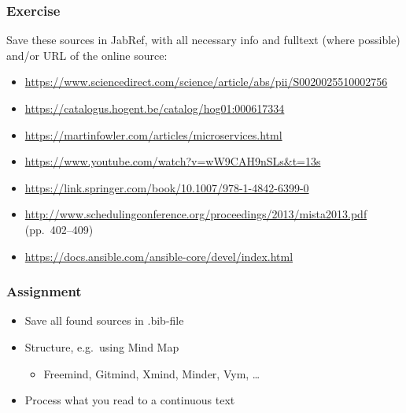\documentclass[aspectratio=169]{beamer}
\begin{document}
\begin{frame}[plain]
  \frametitle{Exercise}

  Save these sources in JabRef, with all necessary info and fulltext (where possible) and/or URL of the online source:

  \bigskip

  \begin{itemize}
    \item \url{https://www.sciencedirect.com/science/article/abs/pii/S0020025510002756}
    \item \url{https://catalogus.hogent.be/catalog/hog01:000617334}
    \item \url{https://martinfowler.com/articles/microservices.html}
    \item \url{https://www.youtube.com/watch?v=wW9CAH9nSLs&t=13s}
    \item \url{https://link.springer.com/book/10.1007/978-1-4842-6399-0}
    \item \url{http://www.schedulingconference.org/proceedings/2013/mista2013.pdf} (pp.\ 402--409)
    \item \url{https://docs.ansible.com/ansible-core/devel/index.html}
  \end{itemize}

\end{frame}

\begin{frame}
  \frametitle{Assignment}

  \begin{itemize}
    \item Save all found sources in .bib-file
    \item Structure, e.g.\ using Mind Map
          \begin{itemize}
            \item Freemind, Gitmind, Xmind, Minder, Vym, \ldots
          \end{itemize}
    \item Process what you read to a continuous text
  \end{itemize}

  \bigskip

\end{frame}
\end{document}
